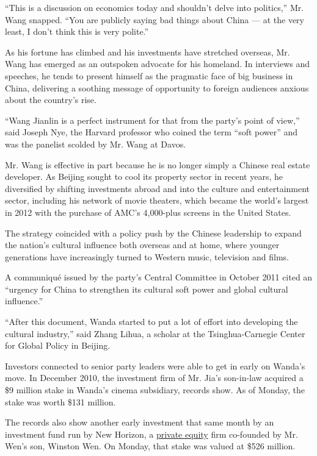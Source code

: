 ``This is a discussion on economics today and shouldn't delve into
politics,'' Mr. Wang snapped. ``You are publicly saying bad things about
China --- at the very least, I don't think this is very polite.''

As his fortune has climbed and his investments have stretched overseas,
Mr. Wang has emerged as an outspoken advocate for his homeland. In
interviews and speeches, he tends to present himself as the pragmatic
face of big business in China, delivering a soothing message of
opportunity to foreign audiences anxious about the country's rise.

``Wang Jianlin is a perfect instrument for that from the party's point
of view,'' said Joseph Nye, the Harvard professor who coined the term
``soft power'' and was the panelist scolded by Mr. Wang at Davos.

Mr. Wang is effective in part because he is no longer simply a Chinese
real estate developer. As Beijing sought to cool its property sector in
recent years, he diversified by shifting investments abroad and into the
culture and entertainment sector, including his network of movie
theaters, which became the world's largest in 2012 with the purchase of
AMC's 4,000-plus screens in the United States.

The strategy coincided with a policy push by the Chinese leadership to
expand the nation's cultural influence both overseas and at home, where
younger generations have increasingly turned to Western music,
television and films.

A communiqué issued by the party's Central Committee in October 2011
cited an ``urgency for China to strengthen its cultural soft power and
global cultural influence.''

``After this document, Wanda started to put a lot of effort into
developing the cultural industry,'' said Zhang Lihua, a scholar at the
Tsinghua-Carnegie Center for Global Policy in Beijing.

Investors connected to senior party leaders were able to get in early on
Wanda's move. In December 2010, the investment firm of Mr. Jia's
son-in-law acquired a \$9 million stake in Wanda's cinema subsidiary,
records show. As of Monday, the stake was worth \$131 million.

The records also show another early investment that same month by an
investment fund run by New Horizon, a
\href{http://topics.nytimes3xbfgragh.onion/top/reference/timestopics/subjects/p/private_equity/index.html?inline=nyt-classifier}{private
equity} firm co-founded by Mr. Wen's son, Winston Wen. On Monday, that
stake was valued at \$526 million.

